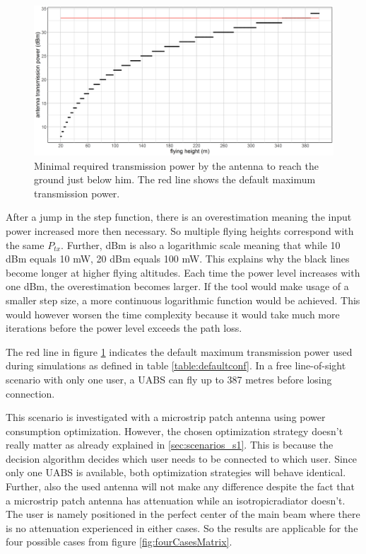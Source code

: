 \begin{figure}[t]
  \centering
  \includegraphics[width=\textwidth]{../results/s1/ptx.png}
  \caption{Minimal required transmission power by the antenna to reach the ground just below him. The red line shows the default maximum transmission power.}
  \label{fig:ptxfh}
\end{figure}

After a jump in the step function, there is an overestimation meaning the input power increased more then necessary. So multiple flying heights correspond with the same $P_{tx}$.
Further, dBm is also a logarithmic scale meaning that while 10 dBm equals 10 mW, 20 dBm equals 100 mW. This explains why the black lines become longer at higher flying altitudes.
Each time the power level increases with one dBm, the overestimation becomes larger. If the tool would make usage of a smaller step size, a more continuous 
logarithmic function would be achieved. This would however worsen the time complexity because it would take much more iterations before 
the power level exceeds the path loss. 

The red line in figure \ref{fig:ptxfh} indicates the default maximum transmission power used during simulations as 
defined in table \ref{table:defaultconf}. 
In a free line-of-sight scenario with only one user, a \gls{UABS} can fly up to 387 metres before losing connection.

This scenario is investigated with a microstrip patch antenna using power consumption optimization. 
 However, the chosen optimization strategy doesn't really matter as already explained in  \ref{sec:scenarios_s1}. This is because the decision 
 algorithm decides which user 
needs to be connected to which user. Since only one \gls{UABS} is available, both optimization strategies will behave identical.
Further, also the used antenna will not make any difference
despite the fact that a microstrip patch antenna has attenuation while an \gls{isotropicradiator} doesn't.
The user is namely positioned in the perfect center of the main beam where there is 
no attenuation experienced in either cases. So the results are applicable for the four possible cases from figure \ref{fig:fourCasesMatrix}.

